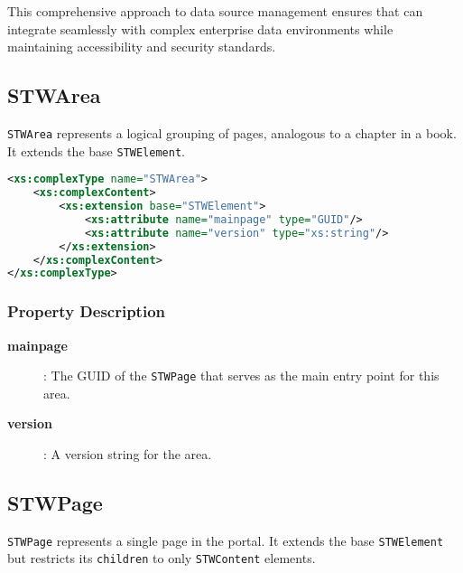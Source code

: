 This comprehensive approach to data source management ensures that \wbdl{} can integrate seamlessly with complex enterprise data environments while maintaining accessibility and security standards.

\subsection{STWArea}

\texttt{STWArea} represents a logical grouping of pages, analogous to a chapter in a book. It extends the base \texttt{STWElement}.

\begin{lstlisting}[language=XML,caption={STWArea Type Definition}]
<xs:complexType name="STWArea">
    <xs:complexContent>
        <xs:extension base="STWElement">
            <xs:attribute name="mainpage" type="GUID"/>
            <xs:attribute name="version" type="xs:string"/>
        </xs:extension>
    </xs:complexContent>
</xs:complexType>
\end{lstlisting}

\subsubsection{Property Description}

\begin{description}
\item[\textbf{mainpage}]: The GUID of the \texttt{STWPage} that serves as the main entry point for this area.
\item[\textbf{version}]: A version string for the area.
\end{description}

\subsection{STWPage}

\texttt{STWPage} represents a single page in the portal. It extends the base \texttt{STWElement} but restricts its \texttt{children} to only \texttt{STWContent} elements.

